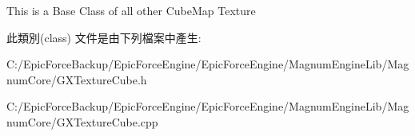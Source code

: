 This is a Base Class of all other Cube\+Map Texture 

此類別(class) 文件是由下列檔案中產生\+:\begin{DoxyCompactItemize}
\item 
C\+:/\+Epic\+Force\+Backup/\+Epic\+Force\+Engine/\+Epic\+Force\+Engine/\+Magnum\+Engine\+Lib/\+Magnum\+Core/G\+X\+Texture\+Cube.\+h\item 
C\+:/\+Epic\+Force\+Backup/\+Epic\+Force\+Engine/\+Epic\+Force\+Engine/\+Magnum\+Engine\+Lib/\+Magnum\+Core/G\+X\+Texture\+Cube.\+cpp\end{DoxyCompactItemize}
